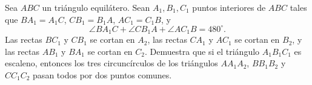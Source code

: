 Sea $ABC$ un triángulo equilátero. Sean $A_1,B_1,C_1$ puntos interiores de $ABC$ tales que $BA_1 =A_1C$, $CB_1 =B_1A$, $AC_1 =C_1B$, y
\[\angle BA_1C + \angle CB_1A + \angle AC_1B = 480^\circ.\]
Las rectas $BC_1$ y $CB_1$ se cortan en $A_2$, las rectas $CA_1$ y $AC_1$ se cortan en $B_2$, y las rectas $AB_1$ y $BA_1$ se cortan en $C_2$. Demuestra que si el triángulo $A_1B_1C_1$ es escaleno, entonces los tres circuncírculos de los triángulos $AA_1A_2$, $BB_1B_2$ y $CC_1C_2$ pasan todos por dos puntos comunes.
